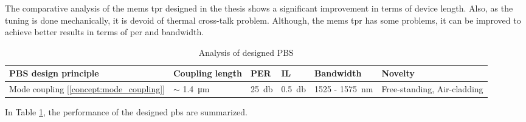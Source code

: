 \documentclass[../report.tex]{subfiles}
\begin{document}
The comparative analysis of the \gls{mems} \gls{tpr} designed in the thesis shows a significant improvement in terms of device length. Also, as the tuning is done mechanically, it is devoid of thermal cross-talk problem.	Although, the \gls{mems} \gls{tpr} has some problems, it can be improved to achieve better results in terms of \gls{per} and bandwidth.

\begin {table}[H]
\begin{center} 
	\begin{tabular}{ | m{7em} | m{1.9cm}| m{1.3cm} | m{1.3cm} | m{7em} | m{7em} | }  
		\hline
		\textbf{PBS design principle} & \textbf{Coupling length} & \textbf{PER} & \textbf{IL} & \textbf{Bandwidth} & \textbf{Novelty}\\ [1.5ex]
		\hline\hline
		Mode coupling [\ref{concept:mode_coupling}] & $\sim$ \SI{1.4}{\micro \meter} & \SI{25}{\decibel} & \SI{0.5}{\decibel} & 1525 - \SI{1575}{\nano \meter} & Free-standing, Air-cladding \\ 
		\hline	
	\end{tabular}
\end{center}
\caption {Analysis of designed PBS} 
\label{table:pbs_summary} 
\end {table}
In Table \ref{table:pbs_summary}, the performance of the designed \gls{pbs} are summarized.
\end{document}
